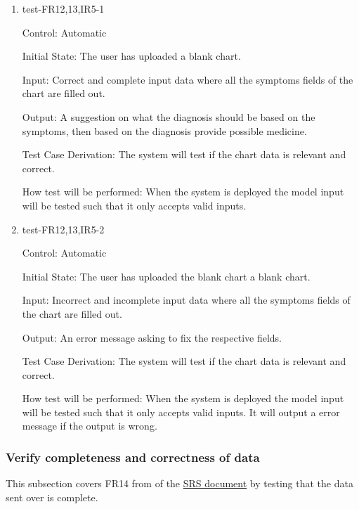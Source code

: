 \documentclass[12pt, titlepage]{article}
\begin{document}
\begin{enumerate}

\item{test-FR12,13,IR5-1} \label{test-FR12,13,IR5-1}

Control: Automatic

Initial State: The user has uploaded a blank chart.

Input: Correct and complete input data where all the symptoms fields of the chart are filled out.

Output: A suggestion on what the diagnosis should be based on the symptoms, then based on the diagnosis provide possible medicine.

Test Case Derivation: The system will test if the chart data is relevant and correct.  

How test will be performed: When the system is deployed the model input will be tested such that it only accepts valid inputs.

\item{test-FR12,13,IR5-2} \label{test-FR12,13,IR5-2}

Control: Automatic

Initial State: The user has uploaded the blank chart a blank chart.

Input: Incorrect and incomplete input data where all the symptoms fields of the chart are filled out.

Output: An error message asking to fix the respective fields.

Test Case Derivation: The system will test if the chart data is relevant and correct.  

How test will be performed: When the system is deployed the model input will be tested such that it only accepts valid inputs. It will output a error message if the output is wrong.

\end{enumerate}


\subsubsection{Verify completeness and correctness of data}\label{section:4.1.8}
This subsection covers FR14 from of the \href{https://github.com/Inreet-Kaur/capstone/blob/main/docs/SRS/SRS.pdf} {SRS document} by testing that the data sent over is complete.
\end{document}
